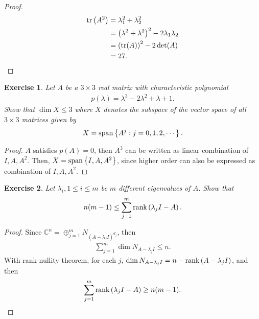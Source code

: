 \documentclass[11pt]{book}
\newtheorem{exercise}{Exercise}[section]
\theoremstyle{definition}
\numberwithin{equation}{subsection}
\begin{document}
\begin{proof}
\begin{align*}
    {\rm tr}\left(A^2 \right) & = \lambda_1^2 + \lambda_2^2 \\
    & = \left(\lambda^2 + \lambda^2\right)^2 - 2 \lambda_1 \lambda_2 \\
    & = \left( {\rm tr}(A)\right)^2 - 2 \det (A) \\
    & = 27.
\end{align*}
\end{proof}

\medskip

\begin{exercise}
Let $A$ be a $3 \times 3$ real matrix with characteristic polynomial
\begin{align*}
    p(\lambda) = \lambda^3 - 2 \lambda^2 + \lambda + 1.
\end{align*}
Show that $\dim X \leq 3$ where $X$ denotes the subspace of the vector space of all $3 \times 3$ matrices given by 
\begin{align*}
    X = {\rm span} \left\{A^j: j = 0,1,2,\cdots\right\}.
\end{align*}
\end{exercise}
\begin{proof}
$A$ satisfies $p(A) = 0$, then $A^3$ can be written as linear combination of $I, A, A^2$. Then, $X = {\rm span} \left\{I, A, A^2\right\}$, since higher order can also be expressed as combination of $I, A, A^2$.
\end{proof}

\medskip

\begin{exercise}
Let $\lambda_i, 1 \leq i \leq m$ be $m$ different eigenvalues of $A$. Show that
\begin{align*}
    n(m - 1) \leq \sum^m_{j=1} \rank \left(\lambda_j I - A\right).
\end{align*}
\end{exercise}
\begin{proof}
Since $\mathbb{C}^n = \oplus^m_{j=1} N_{\left(A - \lambda_j I\right)^{d_j}}$, then 
\begin{align*}
    \sum^m_{j=1} \dim N_{A - \lambda_j I} \leq n.
\end{align*}
With rank-nullity theorem, for each $j$, $\dim N_{A - \lambda_j I} = n - \rank \left(A - \lambda_j I\right)$, and then
\begin{align*}
    \sum^m_{j=1} \rank \left(\lambda_j I - A\right) \geq n(m - 1).
\end{align*}
\end{proof}
\end{document}
